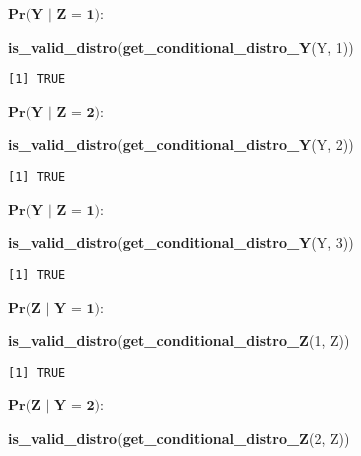 \documentclass[
]{article}
\newenvironment{Shaded}{\begin{snugshade}}{\end{snugshade}}
\newcommand{\DecValTok}[1]{\textcolor[rgb]{0.00,0.00,0.81}{#1}}
\newcommand{\FunctionTok}[1]{\textcolor[rgb]{0.13,0.29,0.53}{\textbf{#1}}}
\newcommand{\NormalTok}[1]{#1}
\begin{document}
\(\textbf{Pr(Y | Z = 1)}\):

\begin{Shaded}
\begin{Highlighting}[]
\FunctionTok{is\_valid\_distro}\NormalTok{(}\FunctionTok{get\_conditional\_distro\_Y}\NormalTok{(Y, }\DecValTok{1}\NormalTok{))}
\end{Highlighting}
\end{Shaded}

\begin{verbatim}
[1] TRUE
\end{verbatim}

\(\textbf{Pr(Y | Z = 2)}\):

\begin{Shaded}
\begin{Highlighting}[]
\FunctionTok{is\_valid\_distro}\NormalTok{(}\FunctionTok{get\_conditional\_distro\_Y}\NormalTok{(Y, }\DecValTok{2}\NormalTok{))}
\end{Highlighting}
\end{Shaded}

\begin{verbatim}
[1] TRUE
\end{verbatim}

\(\textbf{Pr(Y | Z = 1)}\):

\begin{Shaded}
\begin{Highlighting}[]
\FunctionTok{is\_valid\_distro}\NormalTok{(}\FunctionTok{get\_conditional\_distro\_Y}\NormalTok{(Y, }\DecValTok{3}\NormalTok{))}
\end{Highlighting}
\end{Shaded}

\begin{verbatim}
[1] TRUE
\end{verbatim}

\(\textbf{Pr(Z | Y = 1)}\):

\begin{Shaded}
\begin{Highlighting}[]
\FunctionTok{is\_valid\_distro}\NormalTok{(}\FunctionTok{get\_conditional\_distro\_Z}\NormalTok{(}\DecValTok{1}\NormalTok{, Z))}
\end{Highlighting}
\end{Shaded}

\begin{verbatim}
[1] TRUE
\end{verbatim}

\(\textbf{Pr(Z | Y = 2)}\):

\begin{Shaded}
\begin{Highlighting}[]
\FunctionTok{is\_valid\_distro}\NormalTok{(}\FunctionTok{get\_conditional\_distro\_Z}\NormalTok{(}\DecValTok{2}\NormalTok{, Z))}
\end{Highlighting}
\end{Shaded}
\end{document}

